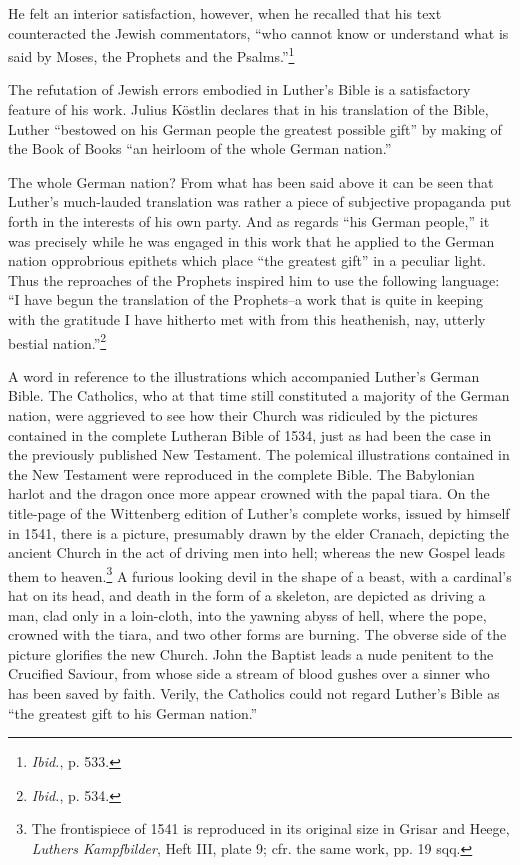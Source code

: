 He felt an interior satisfaction, however, when he recalled that his text
counteracted the Jewish commentators, “who cannot know or understand what is
said by Moses, the Prophets and the Psalms.”\footnote{\textit{Ibid.}, p. 533.}

The refutation of Jewish errors embodied in Luther’s Bible is a
satisfactory feature of his work.
Julius Köstlin declares that in his translation of the Bible, Luther
“bestowed on his German people the greatest possible gift” by making of
the Book of Books “an heirloom of the whole German nation.”

The whole German nation? From what has been said above it can be
seen that Luther’s much-lauded translation was rather a piece of subjective
propaganda put forth in the interests of his own party. And
as regards “his German people,” it was precisely while he was engaged
in this work that he applied to the German nation opprobrious
epithets which place “the greatest gift” in a peculiar light. Thus the
reproaches of the Prophets inspired him to use the following language:
“I have begun the translation of the Prophets--a work that is quite
in keeping with the gratitude I have hitherto met with from this
heathenish, nay, utterly bestial nation.”\footnote{\textit{Ibid.}, p. 534.}

A word in reference to the illustrations which accompanied Luther’s
German Bible. The Catholics, who at that time still constituted a
majority of the German nation, were aggrieved to see how their
Church was ridiculed by the pictures contained in the complete Lutheran
Bible of 1534, just as had been the case in the previously published New
Testament. The polemical illustrations contained in the
New Testament were reproduced in the complete Bible. The Babylonian
harlot and the dragon once more appear crowned with the
papal tiara. On the title-page of the Wittenberg edition of Luther’s
complete works, issued by himself in 1541, there is a picture, presumably
drawn by the elder Cranach, depicting the ancient Church
in the act of driving men into hell; whereas the new Gospel leads
them to heaven.\footnote
{The frontispiece of 1541 is reproduced in its original size in Grisar and Heege,
\textit{Luthers Kampfbilder}, Heft III, plate 9; cfr. the same work, pp. 19 sqq.}
A furious looking devil in the shape of a beast,
with a cardinal’s hat on its head, and death in the form of a skeleton,
are depicted as driving a man, clad only in a loin-cloth, into the yawning
abyss of hell, where the pope, crowned with the tiara, and two
other forms are burning. The obverse side of the picture glorifies the
new Church. John the Baptist leads a nude penitent to the Crucified
Saviour, from whose side a stream of blood gushes over a sinner who
has been saved by faith. Verily, the Catholics could not regard Luther’s
Bible as “the greatest gift to his German nation.”

